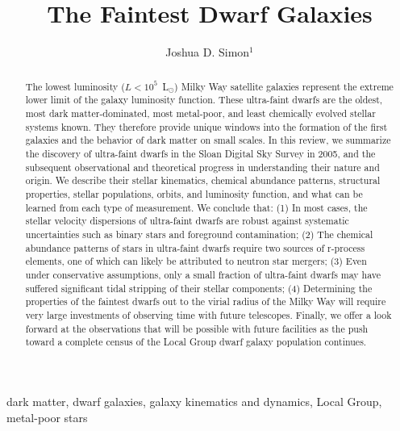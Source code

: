 \documentclass[a4paper]{ar-1col}
\begin{document}

\title{The Faintest Dwarf Galaxies}


\author{Joshua D. Simon$^1$
}

\begin{abstract}
The lowest luminosity ($L < 10^{5}$~L$_{\odot}$) Milky Way satellite
galaxies represent the extreme lower limit of the galaxy luminosity
function.  These ultra-faint dwarfs are the oldest, most dark
matter-dominated, most metal-poor, and least chemically evolved
stellar systems known.  They therefore provide unique windows into the
formation of the first galaxies and the behavior of dark matter on
small scales.  In this review, we summarize the discovery of
ultra-faint dwarfs in the Sloan Digital Sky Survey in 2005, and the
subsequent observational and theoretical progress in understanding
their nature and origin.  We describe their stellar kinematics,
chemical abundance patterns, structural properties, stellar
populations, orbits, and luminosity function, and what can be learned
from each type of measurement.  We conclude that: (1) In most cases,
the stellar velocity dispersions of ultra-faint dwarfs are robust
against systematic uncertainties such as binary stars and foreground
contamination; (2) The chemical abundance patterns of stars in
ultra-faint dwarfs require two sources of r-process elements, one of
which can likely be attributed to neutron star mergers; (3) Even under
conservative assumptions, only a small fraction of ultra-faint dwarfs
may have suffered significant tidal stripping of their stellar
components; (4) Determining the properties of the faintest dwarfs out
to the virial radius of the Milky Way will require very large
investments of observing time with future telescopes.  Finally, we
offer a look forward at the observations that will be possible with
future facilities as the push toward a complete census of the Local
Group dwarf galaxy population continues.
\end{abstract}

\begin{keywords}
dark matter, dwarf galaxies, galaxy kinematics and dynamics, Local
Group, metal-poor stars
\end{keywords}
\maketitle
\end{document}
